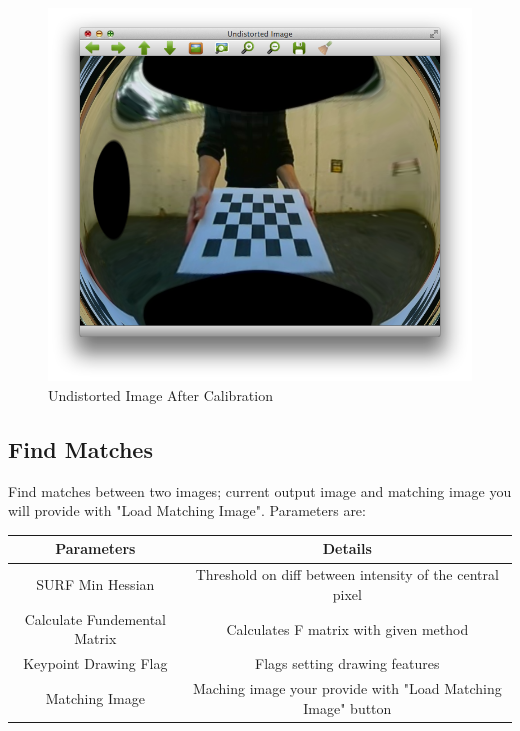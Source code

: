 \documentclass{article}
\begin{document}
\begin{figure}[H]
\begin{center}
\includegraphics[scale=0.3]{toolboxCameraCalibration.png}
\caption{Undistorted Image After Calibration}
\end{center}
\end{figure}	   

\subsection{Find Matches}
Find matches between two images; current output image and matching image you will provide with "Load Matching Image". Parameters are:

\begin{table}[H]
\begin{center}
\begin{tabular}{|c|c|l|l|l|}
\hline
\textbf{Parameters}          & \multicolumn{4}{|c|}{\textbf{Details}}                                             \\ \hline
SURF Min Hessian             & \multicolumn{4}{|c|}{Threshold on diff between intensity of the central pixel}  \\ \hline
Calculate Fundemental Matrix & \multicolumn{4}{|c|}{Calculates F matrix with given method}    \\ \hline
Keypoint Drawing Flag        & \multicolumn{4}{|c|}{Flags setting drawing features}                               \\ \hline
Matching Image               & \multicolumn{4}{|c|}{Maching image your provide with "Load Matching Image" button} \\ \hline
\end{tabular}
\end{center}
\end{table}
\end{document}
